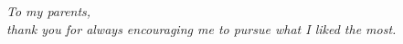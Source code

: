 
\thispagestyle{empty}
{}

\hfill
\vfill

\begin{flushright}
\itshape
To my parents,\\ thank you for always encouraging me to pursue what I liked the most.  
\end{flushright}

\vfill

\cleardoublepage
\endinput
